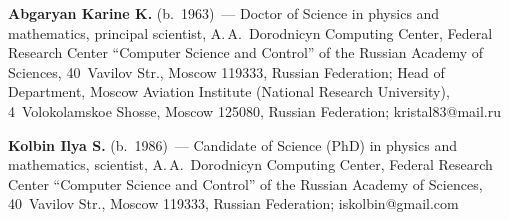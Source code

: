 

\Contr

  \noindent
  \textbf{Abgaryan Karine K.} (b.\ 1963)~---
  Doctor of Science in physics and mathematics, principal scientist, 
A.\,A.~Dorodnicyn Computing Center, Federal Research Center ``Computer Science and Control'' of the 
Russian Academy of Sciences, 40~Vavilov Str., Moscow 119333, Russian Federation; Head of Department, 
Moscow Aviation Institute (National Research University), 4~Volokolamskoe Shosse, Moscow 125080, 
Russian Federation; \mbox{kristal83@mail.ru}
  
  \vspace*{6pt}
  
  \noindent
  \textbf{Kolbin Ilya S.} (b.\ 1986)~--- Candidate of Science (PhD) in physics and mathematics, scientist, 
A.\,A.~Dorodnicyn Computing Center, Federal Research Center ``Computer Science and Control'' of the 
Russian Academy of Sciences, 40~Vavilov Str., Moscow 119333, Russian Federation;
\mbox{iskolbin@gmail.com}
\label{end\stat}

\renewcommand{\bibname}{\protect\rm Литература} 
    